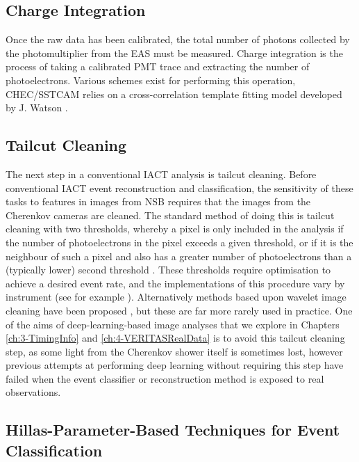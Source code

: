 \subsection{Charge Integration}

Once the raw data has been calibrated, the total number of photons collected by the photomultiplier from the EAS must be measured. Charge integration is the process of taking a calibrated PMT trace and extracting the number of photoelectrons. Various schemes exist for performing this operation, CHEC/SSTCAM relies on a cross-correlation template fitting model developed by J. Watson \cite{jasonthesis}.

\subsection{Tailcut Cleaning}

The next step in a conventional IACT analysis is tailcut cleaning. Before conventional IACT event reconstruction and classification, the sensitivity of these tasks to features in images from NSB requires that the images from the Cherenkov cameras are cleaned. The standard method of doing this is tailcut cleaning with two thresholds, whereby a pixel is only included in the analysis if the number of photoelectrons in the pixel exceeds a given threshold, or if it is the neighbour of such a pixel and also has a greater number of photoelectrons than a (typically lower) second threshold \cite{hegratailcut}. These thresholds require optimisation to achieve a desired event rate, and the implementations of this procedure vary by instrument (see for example \cite{Benbow} \cite{magictailcut} \cite{magictime}). Alternatively methods based upon wavelet image cleaning have been proposed \cite{wavelet}, but these are far more rarely used in practice. One of the aims of deep-learning-based image analyses that we explore in Chapters \ref{ch:3-TimingInfo} and \ref{ch:4-VERITASRealData} is to avoid this tailcut cleaning step, as some light from the Cherenkov shower itself is sometimes lost, however previous attempts at performing deep learning without requiring this step have failed when the event classifier or reconstruction method is exposed to real observations. 

\subsection{Hillas-Parameter-Based Techniques for Event Classification}

